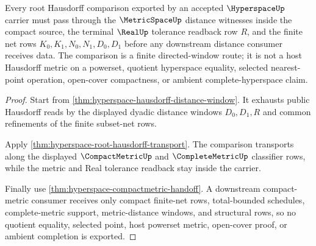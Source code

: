 \begin{theorem}
\label{thm:hyperspace-root-hausdorff-finite-window}
Every root Hausdorff comparison exported by an accepted $\HyperspaceUp$ carrier must pass through the $\MetricSpaceUp$ distance witnesses inside the compact source, the terminal $\RealUp$ tolerance readback row $R$, and the finite net rows $K_0,K_1,N_0,N_1,D_0,D_1$ before any downstream distance consumer receives data. The comparison is a finite directed-window route; it is not a host Hausdorff metric on a powerset, quotient hyperspace equality, selected nearest-point operation, open-cover compactness, or ambient complete-hyperspace claim.
\end{theorem}
\begin{proof}
Start from \autoref{thm:hyperspace-hausdorff-distance-window}. It exhausts public Hausdorff reads by the displayed dyadic distance windows $D_0,D_1,R$ and common refinements of the finite subset-net rows.

Apply \autoref{thm:hyperspace-root-hausdorff-transport}. The comparison transports along the displayed $\CompactMetricUp$ and $\CompleteMetricUp$ classifier rows, while the metric and Real tolerance readback stay inside the carrier.

Finally use \autoref{thm:hyperspace-compactmetric-handoff}. A downstream compact-metric consumer receives only compact finite-net rows, total-bounded schedules, complete-metric support, metric-distance windows, and structural rows, so no quotient equality, selected point, host powerset metric, open-cover proof, or ambient completion is exported.
\end{proof}

